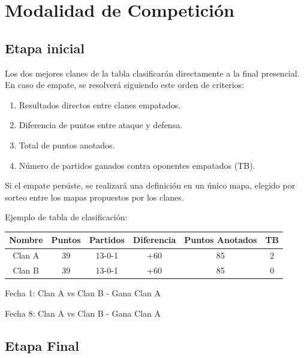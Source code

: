 \documentclass[a4paper, 11pt]{article}
\begin{document}
    \clearpage

    \section{Modalidad de Competición}

    \subsection{Etapa inicial}

    Los dos mejores clanes de la tabla clasificarán directamente a la final presencial.
    En caso de empate, se resolverá siguiendo este orden de criterios:

    \begin{enumerate}
        \item  Resultados directos entre clanes empatados.
        \item  Diferencia de puntos entre ataque y defensa.
        \item  Total de puntos anotados.
        \item  Número de partidos ganados contra oponentes empatados (TB).
    \end{enumerate}
   
    Si el empate persiste, se realizará una definición en un único mapa, elegido por sorteo entre los mapas propuestos por los clanes.\par
    Ejemplo de tabla de clasificación:

    \begin{center}
        \begin{tabular}{||c c c c c c||} 
         \hline
         Nombre & Puntos & Partidos & Diferencia & Puntos Anotados & TB\\ [0.5ex] 
         \hline\hline
         Clan A & 39 & 13-0-1 & +60 & 85 & 2 \\ 
         \hline
         Clan B & 39 & 13-0-1 & +60 & 85 & 0 \\
         \hline
        \end{tabular}
    \end{center}

    Fecha 1: Clan A vs Clan B - Gana Clan A \par
    Fecha 8: Clan A vs Clan B - Gana Clan A

    \subsection{Etapa Final}
\end{document}
